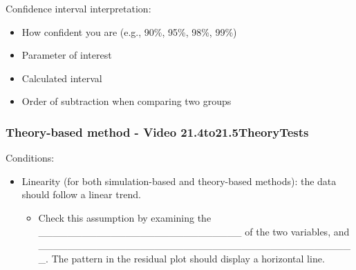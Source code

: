 \documentclass[
]{report}
\providecommand{\tightlist}{%
  \setlength{\itemsep}{0pt}\setlength{\parskip}{0pt}}
\begin{document}
Confidence interval interpretation:

\begin{itemize}
\item
  How confident you are (e.g., 90\%, 95\%, 98\%, 99\%)
\item
  Parameter of interest
\item
  Calculated interval
\item
  Order of subtraction when comparing two groups
\end{itemize}

\vspace{0.8in}

\subsubsection*{Theory-based method - Video 21.4to21.5TheoryTests}\label{theory-based-method---video-21.4to21.5theorytests}

Conditions:


\begin{itemize}
\item
  Linearity (for both simulation-based and theory-based methods): the data should follow a linear trend.

  \begin{itemize}
  \tightlist
  \item
    Check this assumption by examining the \_\_\_\_\_\_\_\_\_\_\_\_\_\_\_\_\_\_\_\_\_\_\_\_\_\_\_\_ of the two variables, and \_\_\_\_\_\_\_\_\_\_\_\_\_\_\_\_\_\_\_\_\_\_\_\_\_\_\_\_\_\_\_\_\_\_\_\_\_\_\_\_\_\_\_\_. The pattern in the residual plot should display a horizontal line.
  \end{itemize}
\end{itemize}

\newpage
\end{document}

